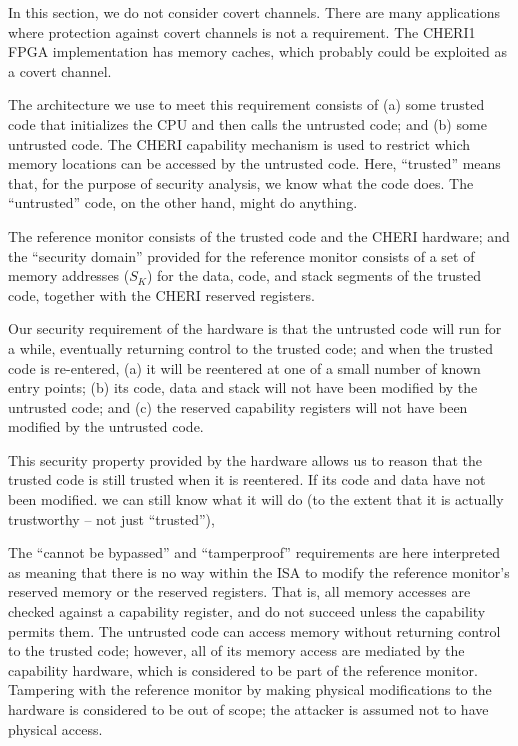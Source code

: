 In this section, we do not consider covert channels. There are many
applications where protection against covert channels is not a requirement.
The CHERI1 FPGA implementation has memory caches, which probably could be
exploited as a covert channel.

The architecture we use to meet this requirement consists of
(a) some trusted code that initializes the CPU and then calls the untrusted
 code; and (b) some untrusted code. The CHERI capability mechanism is
used to restrict which memory locations can be accessed by the untrusted
code.
Here, ``trusted'' means
that, for the purpose of security analysis, we know what the code does. The
``untrusted'' code, on the other hand, might do anything.

The reference monitor consists of the trusted code and the CHERI hardware; and
the ``security domain'' provided for the reference monitor consists of a set of
memory addresses ($S_K$) for the data, code, and stack segments of the trusted
code, together with the CHERI reserved registers.

Our security requirement of the hardware is that the untrusted code will run
for a while, eventually returning control to the trusted code; and when the
trusted code is re-entered, (a) it will be reentered at one of a small number
of known entry points; (b) its code, data and stack will not have been modified
by the untrusted code; and (c) the reserved capability registers will not have
been modified by the untrusted code.

This security property provided by the hardware allows us to reason that the
trusted code is still trusted when it is reentered. If its code and data have
not been modified. we can still know what it will do
(to the extent that it is actually trustworthy -- not just ``trusted''),

The ``cannot be bypassed'' and ``tamperproof'' requirements  are here
interpreted as meaning that there is no way within the ISA to modify the
reference monitor's reserved memory or the reserved registers. That is, all
memory accesses are checked against a capability register, and do not succeed
unless the capability permits them. The untrusted code can access memory without
returning control to the trusted code;
however, all of its memory access are mediated
by the capability hardware, which is considered to be part of the reference
monitor. Tampering with the reference monitor by making physical modifications
to the hardware is considered to be out of scope; the attacker is assumed
not to have physical access.

